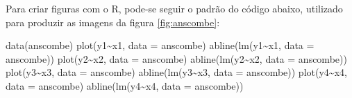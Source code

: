 \documentclass[
	12pt,				%
	oneside,			%
	a4paper,			%
	chapter=TITLE,		%
	section=TITLE,		%
	english,			%
	brazil				%
	]{abntex2}
\let\proglang=\textsf
\newenvironment{Shaded}{\begin{snugshade}}{\end{snugshade}}
\newcommand{\AttributeTok}[1]{\textcolor[rgb]{0.77,0.63,0.00}{#1}}
\newcommand{\FunctionTok}[1]{\textcolor[rgb]{0.00,0.00,0.00}{#1}}
\newcommand{\NormalTok}[1]{#1}
\newcommand{\SpecialCharTok}[1]{\textcolor[rgb]{0.00,0.00,0.00}{#1}}
\begin{document}
Para criar figuras com o \proglang{R}, pode-se seguir o padrão do código
abaixo, utilizado para produzir as imagens da figura \ref{fig:anscombe}:
\begin{Shaded}
\begin{Highlighting}[]
\FunctionTok{data}\NormalTok{(anscombe)}
\FunctionTok{plot}\NormalTok{(y1}\SpecialCharTok{\textasciitilde{}}\NormalTok{x1, }\AttributeTok{data =}\NormalTok{ anscombe)}
\FunctionTok{abline}\NormalTok{(}\FunctionTok{lm}\NormalTok{(y1}\SpecialCharTok{\textasciitilde{}}\NormalTok{x1, }\AttributeTok{data =}\NormalTok{ anscombe))}
\FunctionTok{plot}\NormalTok{(y2}\SpecialCharTok{\textasciitilde{}}\NormalTok{x2, }\AttributeTok{data =}\NormalTok{ anscombe)}
\FunctionTok{abline}\NormalTok{(}\FunctionTok{lm}\NormalTok{(y2}\SpecialCharTok{\textasciitilde{}}\NormalTok{x2, }\AttributeTok{data =}\NormalTok{ anscombe))}
\FunctionTok{plot}\NormalTok{(y3}\SpecialCharTok{\textasciitilde{}}\NormalTok{x3, }\AttributeTok{data =}\NormalTok{ anscombe)}
\FunctionTok{abline}\NormalTok{(}\FunctionTok{lm}\NormalTok{(y3}\SpecialCharTok{\textasciitilde{}}\NormalTok{x3, }\AttributeTok{data =}\NormalTok{ anscombe))}
\FunctionTok{plot}\NormalTok{(y4}\SpecialCharTok{\textasciitilde{}}\NormalTok{x4, }\AttributeTok{data =}\NormalTok{ anscombe)}
\FunctionTok{abline}\NormalTok{(}\FunctionTok{lm}\NormalTok{(y4}\SpecialCharTok{\textasciitilde{}}\NormalTok{x4, }\AttributeTok{data =}\NormalTok{ anscombe))}
\end{Highlighting}
\end{Shaded}
\end{document}

